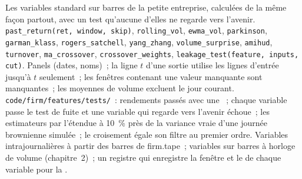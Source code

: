 \begin{build}
 Les variables standard sur barres de la petite entreprise, calculées de la même façon partout, avec un test qu'aucune d'elles ne regarde vers l'avenir.
 \texttt{past\_return(ret, window, skip)}, \texttt{rolling\_vol}, \texttt{ewma\_vol}, \texttt{parkinson},
\texttt{garman\_klass}, \texttt{rogers\_satchell}, \texttt{yang\_zhang}, \texttt{volume\_surprise}, \texttt{amihud},
\texttt{turnover}, \texttt{ma\_crossover}, \texttt{crossover\_weights}, \texttt{leakage\_test(feature, inputs, cut)}.
 Panels (dates, noms)~; la ligne $t$ d'une sortie utilise les lignes d'entrée jusqu'à $t$ seulement~; les fenêtres contenant une valeur manquante sont manquantes~;
les moyennes de volume excluent le jour courant.
 \texttt{code/firm/features/tests/}~: rendements passés avec une ~; chaque variable passe le test de fuite et une
variable qui regarde vers l'avenir échoue~; les estimateurs par l'étendue à 10~\% près de la variance vraie d'une journée brownienne simulée~; le croisement égale son
filtre au premier ordre.
 Variables intrajournalières à partir des barres de firm.tape~; variables sur barres à horloge de volume (chapitre~2)~; un registre qui enregistre la
fenêtre et le  de chaque variable pour la .
\end{build}

